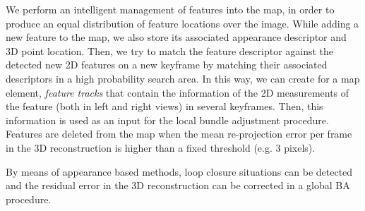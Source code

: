 We perform an intelligent management of features into the map, in
order to produce an equal distribution of feature locations over the
image. While adding a new feature to the map, we also store its
associated appearance descriptor and 3D point location. Then, we try
to match the feature descriptor against the detected new 2D features
on a new keyframe by matching their associated descriptors in a high
probability search area. In this way, we can create for a map element,
\textit{feature tracks} that contain the information of the 2D
measurements of the feature (both in left and right views) in several
keyframes. Then, this information is used as an input for the local
bundle adjustment procedure. Features are deleted from the map when
the mean re-projection error per frame in the 3D reconstruction is
higher than a fixed threshold (e.g. 3 pixels).

By means of appearance based methods, loop closure situations can be
detected and the residual error in the 3D reconstruction can be
corrected in a global BA procedure.
